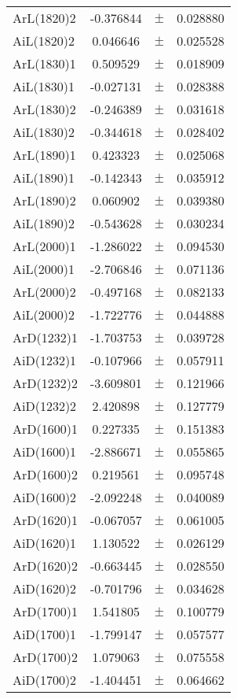 \begin{table}
\begin{tiny}
\begin{tabular}{lccc}
ArL(1820)2 & -0.376844 & $\pm$ & 0.028880 \\
AiL(1820)2 & 0.046646 & $\pm$ & 0.025528 \\
ArL(1830)1 & 0.509529 & $\pm$ & 0.018909 \\
AiL(1830)1 & -0.027131 & $\pm$ & 0.028388 \\
ArL(1830)2 & -0.246389 & $\pm$ & 0.031618 \\
AiL(1830)2 & -0.344618 & $\pm$ & 0.028402 \\
ArL(1890)1 & 0.423323 & $\pm$ & 0.025068 \\
AiL(1890)1 & -0.142343 & $\pm$ & 0.035912 \\
ArL(1890)2 & 0.060902 & $\pm$ & 0.039380 \\
AiL(1890)2 & -0.543628 & $\pm$ & 0.030234 \\
ArL(2000)1 & -1.286022 & $\pm$ & 0.094530 \\
AiL(2000)1 & -2.706846 & $\pm$ & 0.071136 \\
ArL(2000)2 & -0.497168 & $\pm$ & 0.082133 \\
AiL(2000)2 & -1.722776 & $\pm$ & 0.044888 \\
ArD(1232)1 & -1.703753 & $\pm$ & 0.039728 \\
AiD(1232)1 & -0.107966 & $\pm$ & 0.057911 \\
ArD(1232)2 & -3.609801 & $\pm$ & 0.121966 \\
AiD(1232)2 & 2.420898 & $\pm$ & 0.127779 \\
ArD(1600)1 & 0.227335 & $\pm$ & 0.151383 \\
AiD(1600)1 & -2.886671 & $\pm$ & 0.055865 \\
ArD(1600)2 & 0.219561 & $\pm$ & 0.095748 \\
AiD(1600)2 & -2.092248 & $\pm$ & 0.040089 \\
ArD(1620)1 & -0.067057 & $\pm$ & 0.061005 \\
AiD(1620)1 & 1.130522 & $\pm$ & 0.026129 \\
ArD(1620)2 & -0.663445 & $\pm$ & 0.028550 \\
AiD(1620)2 & -0.701796 & $\pm$ & 0.034628 \\
ArD(1700)1 & 1.541805 & $\pm$ & 0.100779 \\
AiD(1700)1 & -1.799147 & $\pm$ & 0.057577 \\
ArD(1700)2 & 1.079063 & $\pm$ & 0.075558 \\
AiD(1700)2 & -1.404451 & $\pm$ & 0.064662 \\
\bottomrule
\end{tabular}
\end{tiny}
\end{table}

